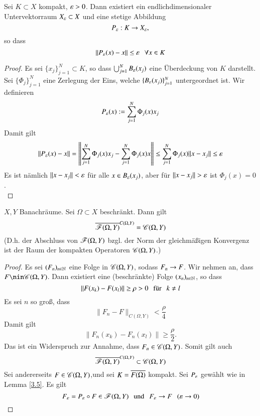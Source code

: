 \begin{lem}\label{3.5}
    Sei $K\subset X$ kompakt, $\varepsilon>0$. Dann existiert ein endlichdimensionaler Untervektorraum $X_\varepsilon
    \subset X$ und eine stetige Abbildung
    \[
        P_\varepsilon:K\rightarrow X_\varepsilon,
    \]
    so dass
    \[
        \|P_\varepsilon(x)-x\|\leq \varepsilon \hspace{.25cm} \forall x\in K
    \]
\end{lem}

\begin{proof}
    Es sei $\{x_j\}_{j=1}^N\subset K$, so dass $\bigcup _{j=1}^NB_\varepsilon(x_j)$ eine Überdeckung von $K$
    darstellt. Sei $\{\Phi_j\}_{j=1}^N$ eine Zerlegung der Eins, welche $\{B_\varepsilon(x_j)\}_{j=1}^N$
    untergeordnet ist. Wir definieren
    \[
        P_\varepsilon(x):= \sum_{j=1}^N \Phi_j(x)x_j
    \]
    Damit gilt
    \[
        \|P_\varepsilon(x)-x\|=\left\|\sum_{j=1}^N\Phi_j(x)x_j-\sum_{j=1}^N \Phi_j(x)x\right\|
        \leq \sum_{j=1}^N \Phi_j(x)\|x-x_j\|\leq \varepsilon
    \]
    Es ist nämlich $\|x-x_j\|< \varepsilon$ für alle $x\in B_\varepsilon(x_j)$, aber für $\|x-x_j\|>\eps$ ist
    $\Phi_j(x)=0$.
    \[ \]
\end{proof}

\begin{theorem}\label{3.6}
    $X,Y$ Banachräume. Sei $\Omega\subset X$ beschränkt. Dann gilt
    \[
        \overline{\mathscr F(\Omega,Y)}^{C(\Omega,Y)}=\mathscr C(\Omega,Y)
    \]
    (D.h. der Abschluss von $\mathscr F(\Omega,Y)$ bzgl. der Norm der gleichmäßigen Konvergenz ist der Raum
     der kompakten Operatoren $\mathscr C(\Omega,Y)$.)
\end{theorem}

\begin{proof}
    Es sei $(F_n)_{n\in \mathbb{N}}$ eine Folge in $\mathscr C(\Omega,Y)$, sodass  $F_n\rightarrow F$. Wir nehmen an, dass
    $F\nin \ms C(\Omega,Y)$. Dann existiert eine (beschränkte) Folge $(x_n)_{n\in \mathbb{N}}$, so dass
    \[
        \|F(x_k)-F(x_l)\|\geq \rho>0 \hspace{.25cm}\text{für}\hspace{.25cm} k\neq l
    \]
    Es sei $n$ so groß, dass
    \[
        \|F_n-F\|_{ C(\Omega,Y)}<\frac{\rho}{4}
    \]
    Damit gilt
    \[
        \|F_n(x_k)-F_n(x_l)\|\geq \frac\rho2.
    \]
    Das ist ein Widerspruch zur Annahme, dass $F_n\in \mathscr C(\Omega,Y)$. Somit gilt auch
    \[
        \overline{\mathscr F(\Omega,Y)}^{C(\Omega,Y)}\subset \mathscr C(\Omega,Y)
    \]
    Sei andererseits $F\in \mathscr C(\Omega,Y)$,und sei $K=\overline{F(\Omega)}$ kompakt. Sei $P_\varepsilon$ gewählt wie
    in Lemma \ref{3.5}. Es gilt
    \[
        F_\varepsilon=P_\varepsilon\circ F\in \mathscr F(\Omega,Y) \hspace{.25cm} \text{und}\hspace{.25cm} F_\varepsilon\rightarrow F \hspace{.25cm} (\varepsilon \rightarrow 0)
    \]
\end{proof}

